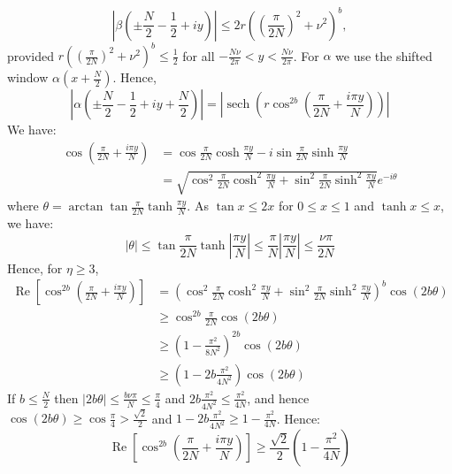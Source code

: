 \documentclass[aps,floatfix,10pt,amssymb,amsfont,amsmath,superscriptaddress,float,nofootinbib,longbibliography,nobalancelastpage,twocolumn]{revtex4-2}
\begin{document}
\begin{equation}
\left|\beta\left(\pm\frac{N}{2}-\frac12+iy\right)\right|
\leq
2r\left(
\left(\frac{\pi}{2N}\right)^2+\nu^2
\right)^{b},
\label{eq:verticalbetabound}
\end{equation}
provided $r\left(
\left(\frac{\pi}{2N}\right)^2+\nu^2
\right)^{b}\leq\frac12$ for all $-\frac{N\nu}{2\pi}<y<\frac{N\nu}{2\pi}$.
For $\alpha$ we use the shifted window $\alpha(x+\frac{N}{2})$. Hence,
\begin{equation}
    \left|\alpha(\pm\frac{N}{2}-\frac12+iy+\frac{N}{2})\right| = \left|\operatorname{sech}\!\left(
r\cos^{2b}\left(\frac{\pi}{2N} +\frac{i\pi y}{N}\right)
\right)\right|
\end{equation}
We have:
\begin{align}
   \cos\left(\frac{\pi}{2N} +\frac{i \pi y}{N}\right) &= \cos \frac{\pi}{2N} \cosh \frac{ \pi y}{N} -i \sin \frac{\pi}{2N} \sinh \frac{ \pi y}{N} \\
   &= \sqrt{\cos^2 \frac{\pi}{2N} \cosh^2 \frac{ \pi y}{N}+\sin^2 \frac{\pi}{2N} \sinh^2 \frac{ \pi y}{N} }e^{-i\theta}
\end{align}
where $\theta = \arctan \tan \frac{\pi}{2N} \tanh \frac{ \pi y}{N} $. As $\tan x \leq 2x$ for $ 0\leq x \leq 1$ and $\tanh x \leq x$, we have:
\begin{equation}
    |\theta| \leq \tan \frac{\pi}{2N} \tanh \left|\frac{ \pi y}{N}\right| \leq \frac{\pi}{N}\left|\frac{ \pi y}{N}\right|\leq \frac{\nu\pi}{2N}
\end{equation}
Hence, for $\eta \geq 3$,
\begin{align}
   \operatorname{Re} \left[\cos^{2b}\left(\frac{\pi}{2N} +\frac{i \pi y}{N}\right) \right] &= \left(\cos^2 \frac{\pi}{2N} \cosh^2 \frac{ \pi y}{N}+\sin^2 \frac{\pi}{2N} \sinh^2 \frac{ \pi y}{N} \right)^{b} \cos (2b \theta) \\
   &\geq \cos^{2b} \frac{\pi}{2N} \cos (2b\theta)\\
   & \geq \left(1-\frac{\pi^2}{8N^2}\right)^{2b} \cos (2b\theta)\\
   & \geq \left(1-2b\frac{\pi^2}{4N^2}\right)\cos (2b\theta)
\end{align}
If $b \leq \frac{N}{2}$ then $|2b\theta| \leq \frac{b\nu \pi}{N} \leq \frac{\pi}{4}$ and $2b\frac{\pi^2}{4N^2} \leq \frac{\pi^2}{4N}$, and hence $\cos (2b \theta) \geq \cos \frac{\pi}{4} > \frac{\sqrt{2}}{2}$ and $ 1-2b\frac{\pi^2}{4N^2}\geq 1-\frac{\pi^2}{4N}$. Hence:
\begin{equation}
    \operatorname{Re} \left[\cos^{2b}\left(\frac{\pi}{2N} +\frac{i \pi y}{N}\right) \right] \geq \frac{\sqrt{2}}{2}\left(1-\frac{\pi^2}{4N}\right)
\end{equation}
\end{document}

